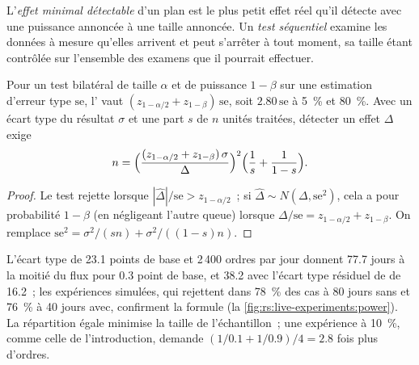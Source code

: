 \begin{definition}\label{def:rs:live-experiments:mde}
L'\emph{effet minimal détectable} d'un plan est le plus petit effet réel qu'il détecte avec une puissance annoncée à une taille annoncée.
Un \emph{test séquentiel} examine les données à mesure qu'elles arrivent et peut s'arrêter à tout moment, sa taille étant contrôlée sur l'ensemble des examens que
il pourrait effectuer.
\end{definition}

\begin{proposition}\label{prop:rs:live-experiments:mde}
Pour un test bilatéral de taille $\alpha$ et de puissance $1-\beta$ sur une estimation d'erreur type $\mathrm{se}$, l' vaut
$(z_{1-\alpha/2} + z_{1-\beta})\,\mathrm{se}$, soit $2.80\,\mathrm{se}$ à 5~\% et 80~\%. Avec un écart type du résultat $\sigma$ et une part $s$ de $n$
unités traitées, détecter un effet $\Delta$ exige
\[
n = \Bigl(\frac{(z_{1-\alpha/2} + z_{1-\beta})\,\sigma}{\Delta}\Bigr)^2\Bigl(\frac1s + \frac1{1-s}\Bigr).
\]
\end{proposition}

\begin{proof}
Le test rejette lorsque $|\hat\Delta|/\mathrm{se} > z_{1-\alpha/2}$~; si $\hat\Delta \sim N(\Delta, \mathrm{se}^2)$, cela a pour probabilité $1-\beta$ (en négligeant
l'autre queue) lorsque $\Delta/\mathrm{se} = z_{1-\alpha/2} + z_{1-\beta}$. On remplace $\mathrm{se}^2 = \sigma^2/(sn) + \sigma^2/((1-s)n)$.
\end{proof}

L'écart type de 23.1 points de base et 2\,400 ordres par jour donnent 77.7 jours à la moitié du flux pour 0.3 point de base, et 38.2 avec l'écart type résiduel
de  de 16.2~; les expériences simulées, qui rejettent dans 78~\% des cas à 80 jours sans  et 76~\% à 40 jours avec, confirment la formule
(la \cref{fig:rs:live-experiments:power}). La répartition égale minimise la taille de l'échantillon~; une expérience à 10~\%, comme celle de l'introduction, demande $(1/0.1 + 1/0.9)/4 = 2.8$
fois plus d'ordres.


